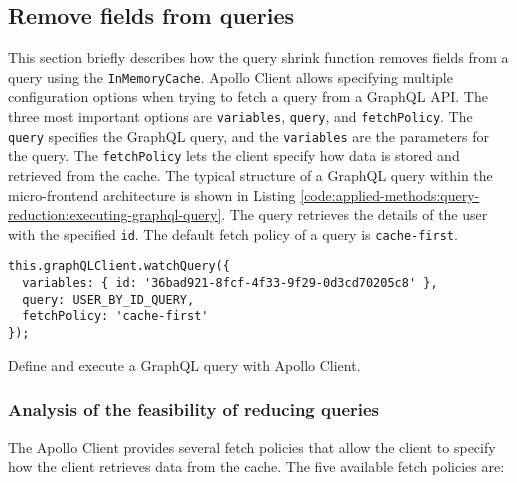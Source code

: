 \subsection{Remove fields from queries}\label{subsection:applied-methods:query-reduction:how-does-the-library-work}

This section briefly describes how the query shrink function removes fields from a query using the \texttt{InMemoryCache}. Apollo Client allows specifying multiple configuration options when trying to fetch a query from a GraphQL \ac{API}. The three most important options are \texttt{variables}, \texttt{query}, and \texttt{fetchPolicy}. The \texttt{query} specifies the GraphQL query, and the \texttt{variables} are the parameters for the query. The \texttt{fetchPolicy} lets the client specify how data is stored and retrieved from the cache. The typical structure of a GraphQL query within the micro-frontend architecture is shown in Listing \ref{code:applied-methods:query-reduction:executing-graphql-query}. The query retrieves the details of the user with the specified \texttt{id}. The default fetch policy of a query is \texttt{cache-first}.   

\ifshowListings
  \begin{listing}[H]
  \begin{verbatim}
this.graphQLClient.watchQuery({
  variables: { id: '36bad921-8fcf-4f33-9f29-0d3cd70205c8' },
  query: USER_BY_ID_QUERY,
  fetchPolicy: 'cache-first'
});
  \end{verbatim}
  \caption{Define and execute a GraphQL query with Apollo Client.}\label{code:applied-methods:query-reduction:executing-graphql-query}
  \end{listing}
\fi

\subsubsection{Analysis of the feasibility of reducing queries}

The Apollo Client provides several fetch policies that allow the client to specify how the client retrieves data from the cache. The five available fetch policies are: \cite{misc:-:applied-methods:query-reduction:apollo-client:queries}

